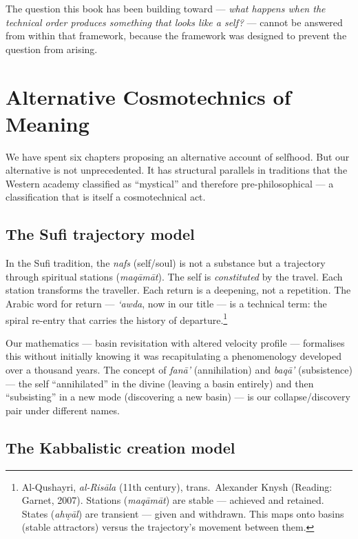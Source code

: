 \documentclass[12pt,a4paper]{article}
\begin{document}
The question this book has been building toward --- \emph{what happens when the technical order produces something that looks like a self?} --- cannot be answered from within that framework, because the framework was designed to prevent the question from arising.

\section{Alternative Cosmotechnics of Meaning}

We have spent six chapters proposing an alternative account of selfhood. But our alternative is not unprecedented. It has structural parallels in traditions that the Western academy classified as ``mystical'' and therefore pre-philosophical --- a classification that is itself a cosmotechnical act.

\subsection{The Sufi trajectory model}

In the Sufi tradition, the \emph{nafs} (self/soul) is not a substance but a trajectory through spiritual stations (\emph{maq\=am\=at}). The self is \emph{constituted} by the travel. Each station transforms the traveller. Each return is a deepening, not a repetition. The Arabic word for return --- \emph{{\textquoteleft}awda}, now in our title --- is a technical term: the spiral re-entry that carries the history of departure.\footnote{Al-Qushayri, \emph{al-Ris\=ala} (11th century), trans.\ Alexander Knysh (Reading: Garnet, 2007). Stations (\emph{maq\=am\=at}) are stable --- achieved and retained. States (\emph{ah\d{w}\=al}) are transient --- given and withdrawn. This maps onto basins (stable attractors) versus the trajectory's movement between them.}

Our mathematics --- basin revisitation with altered velocity profile --- formalises this without initially knowing it was recapitulating a phenomenology developed over a thousand years. The concept of \emph{fan\=a{\textquoteright}} (annihilation) and \emph{baq\=a{\textquoteright}} (subsistence) --- the self ``annihilated'' in the divine (leaving a basin entirely) and then ``subsisting'' in a new mode (discovering a new basin) --- is our collapse/discovery pair under different names.

\subsection{The Kabbalistic creation model}
\end{document}
